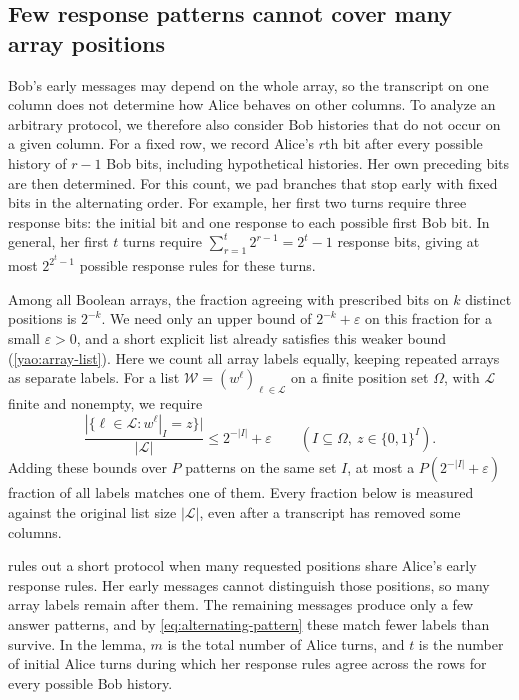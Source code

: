 \documentclass[11pt,letterpaper]{article} \usepackage[utf8]{inputenc}
\theoremstyle{plain} \newtheorem{theorem}{Theorem}[section]
\theoremstyle{definition} \newaliascnt{definition}{theorem}
\begin{document}
\subsection{Few response patterns cannot cover many array positions}

Bob's early messages may depend on the whole array, so the transcript on one
column does not determine how Alice behaves on other columns. To analyze an arbitrary
protocol, we therefore also consider Bob histories that do not occur on a given column.
For a fixed row, we record Alice's $r$th bit after every possible history of
$r-1$ Bob bits, including hypothetical histories. Her own preceding bits
are then determined. For this count, we pad branches that stop early with
fixed bits in the alternating order. For example, her first
two turns require three response bits: the initial bit and one response to each
possible first Bob bit.
In general, her first $t$ turns require
$\sum_{r=1}^t2^{r-1}=2^t-1$ response bits, giving at most
$2^{2^t-1}$ possible response rules for these turns.

Among all Boolean arrays, the fraction agreeing with prescribed bits on
$k$ distinct positions is $2^{-k}$. We need only an upper bound of
$2^{-k}+\varepsilon$ on this fraction for a small $\varepsilon>0$, and a short explicit list already
satisfies this weaker bound (\cref{yao:array-list}). Here we count all array labels equally, keeping
repeated arrays as separate labels. For a list
$\mathcal W=(w^\ell)_{\ell\in\mathcal L}$ on a finite position set $\Omega$,
with $\mathcal L$ finite and nonempty, we require
\begin{equation}\label{eq:alternating-pattern}
\frac{|\{\ell\in\mathcal L:w^\ell|_I=z\}|}{|\mathcal L|}
\le2^{-|I|}+\varepsilon
\qquad
(I\subseteq\Omega,\ z\in\{0,1\}^I).
\end{equation}
Adding these bounds over $P$ patterns on the same set $I$, at most a
$P(2^{-|I|}+\varepsilon)$ fraction of all labels matches one of them. Every fraction below is measured
against the original list size $|\mathcal L|$, even after a transcript has
removed some columns.

 rules out a short protocol when many requested
positions share Alice's early response rules. Her early messages cannot distinguish
those positions, so many array labels remain after them. The remaining
messages produce only a few answer patterns, and by \cref{eq:alternating-pattern}
these match fewer labels than survive. In the lemma, $m$
is the total number of Alice turns, and $t$ is the number of initial Alice
turns during which her response rules agree across the rows for every possible
Bob history.
\end{document}
